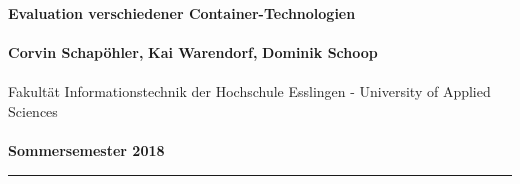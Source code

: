 \renewcommand{\footnoterule}{\hspace{-0.5cm}\rule{6cm}{1pt}{\vspace*{2pt}}}
\begin{center}
\newcommand{\SchapoehlerCorvinThema}{Evaluation verschiedener Container-Technologien}
		\baselineskip15pt
		\textbf{\textcolor{hs_dunkelblau}{\large{Evaluation verschiedener Container-Technologien}}}\\\ \\
		\baselineskip10pt
\newcommand{\SchapoehlerCorvin}{Corvin \newline Schapöhler}
		\textbf{\textcolor{hs_dunkelblau}{Corvin Schapöhler\label{SchapoehlerCorvin},}\hspace{.5cm}}
\textbf{\textcolor{hs_dunkelblau}{
Kai Warendorf,}}
\hspace{.5cm}\textbf{\textcolor{hs_dunkelblau}{
Dominik Schoop}}
\textcolor{hs_dunkelblau}{\\\ \\Fakultät Informationstechnik der Hochschule Esslingen - University of Applied Sciences}\\\ \\
\textcolor{hs_dunkelblau}{\textbf{Sommersemester 2018}}
\color{hs_dunkelblau}\rule{\linewidth}{1.5pt}
\end{center}
\setcounter{figure}{0}
\renewcommand{\bildI}{
 \begin{center}
 \begin{minipage}[t]{\linewidth}
 \begin{center}
  \includegraphics*[width=\linewidth]
{../tmp/SchapoehlerCorvin/Corvin_Schapoehler_Bild01.jpg}
  \captionof{figure}{\fontspec{Lucida Sans} \footnotesize Vergleich: Virutalisierung von VM und Isolation von Container}
  \end{center}
  \end{minipage}
 \end{center}
}

\renewcommand{\bildII}{
 \begin{center}
  \begin{minipage}[t]{\linewidth}
  \begin{center}
  \includegraphics*[width=\linewidth]
{../tmp/SchapoehlerCorvin/Corvin_Schapoehler_Bild02.png}
  \captionof{figure}{\fontspec{Lucida Sans} \footnotesize Timline der wichtigsten Konzepte zur Isolation im Linux-Kernel}
  \end{center}
  \end{minipage}
 \end{center}
}

